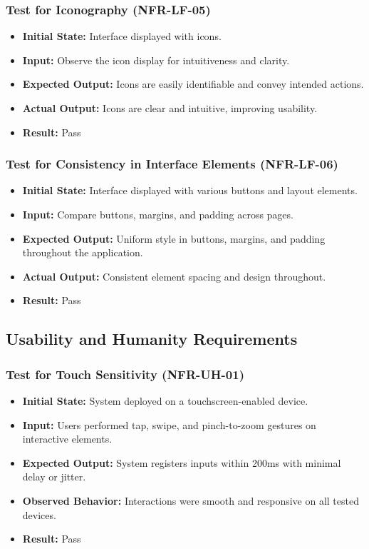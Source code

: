 \documentclass[12pt, titlepage]{article}
\begin{document}
\subsubsection{Test for Iconography (NFR-LF-05)}
\begin{itemize}
    \item \textbf{Initial State: }Interface displayed with icons.
    \item \textbf{Input: }Observe the icon display for intuitiveness and clarity.
    \item \textbf{Expected Output: }Icons are easily identifiable and convey intended actions.
    \item \textbf{Actual Output: }Icons are clear and intuitive, improving usability.
    \item \textbf{Result: }Pass
\end{itemize}

\subsubsection{Test for Consistency in Interface Elements (NFR-LF-06)}
\begin{itemize}
    \item \textbf{Initial State: }Interface displayed with various buttons and layout elements.
    \item \textbf{Input: }Compare buttons, margins, and padding across pages.
    \item \textbf{Expected Output: }Uniform style in buttons, margins, and padding throughout the application.
    \item \textbf{Actual Output: }Consistent element spacing and design throughout.
    \item \textbf{Result: }Pass
\end{itemize}

\subsection{Usability and Humanity Requirements}

\subsubsection{Test for Touch Sensitivity (NFR-UH-01)}
\begin{itemize}
    \item \textbf{Initial State:} System deployed on a touchscreen-enabled device.
    \item \textbf{Input:} Users performed tap, swipe, and pinch-to-zoom gestures on interactive elements.
    \item \textbf{Expected Output:} System registers inputs within 200ms with minimal delay or jitter.
    \item \textbf{Observed Behavior:} Interactions were smooth and responsive on all tested devices.
    \item \textbf{Result:} Pass
\end{itemize}
\end{document}
